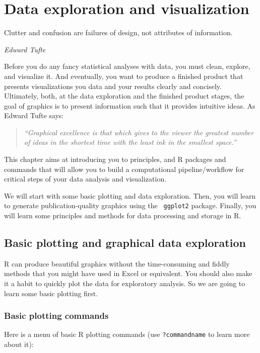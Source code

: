 \chapter{Data exploration and visualization}
\label{chap:R_data}

\epigraph{Clutter and confusion are failures of design, not attributes 
of information.}{\textit{Edward Tufte}}

Before you do any fancy statistical analyses with data, you must clean, 
explore, and visualize it. And eventually, you want to produce a 
finished product that presents visualizations you data and your results 
clearly and concisely. Ultimately, both, at the data exploration and the 
finished product stages, the goal of graphics is to present information 
such that it provides intuitive ideas. As Edward Tufte says: 
\begin{quote} \it
``Graphical excellence is that which gives to the viewer the greatest 
number of ideas in the shortest time with the least ink in the smallest 
space.'' 
\end{quote}

This chapter aims at introducing you to principles, and R packages and 
commands that will allow you to build a computational pipeline/workflow 
for critical steps of your data analysis and visualization. 

We will start with some basic plotting and data exploration. Then, you 
will learn to generate publication-quality graphics using the {\tt 
ggplot2} package. Finally, you will learn some principles and methods 
for data processing and storage in R. 

\section{Basic plotting and graphical data exploration}

R can produce beautiful graphics without the time-consuming and fiddly 
methods that you might have used in Excel or equivalent. You should 
also make it a habit to quickly plot the data for exploratory analysis. 
So we are going to learn some basic plotting first. 

\subsection{Basic plotting commands} 

Here is a menu of basic R plotting commands (use {\tt ?commandname} to 
learn more about it):

